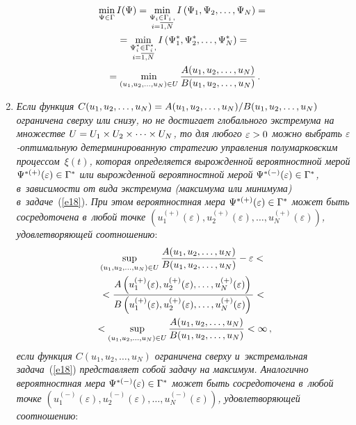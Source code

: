 \begin{multicols}{2}
\begin{enumerate}[1.]
\noindent
\begin{multline*}
\min\limits_{\Psi \in \Gamma} I(\Psi)=
\min\limits_{\substack{{\Psi_i \in \Gamma_i\,,}\\ 
{i=\overline{1,N}}}} I\left(\Psi_1,\Psi_2,\ldots,\Psi_N\right)={}\\
{}=
\min\limits_{\substack{{\Psi_i^* \in \Gamma_i^*,}\\ 
{i=\overline{1,N}}}}
I\left(\Psi_1^*,\Psi_2^*,\ldots,\Psi_N^*\right)={}\\
{}=\min\limits_{(u_1,u_2,\ldots,u_N)\in U}\fr{A(u_1,u_2,\ldots,u_N)}
{B(u_1,u_2,\ldots,u_N)}\,. %
\end{multline*}
\item \textit{Если функция $C(u_1,u_2,\ldots,u_N)\hm=
{A(u_1,u_2,\ldots,u_N)}/{B(u_1,u_2,\ldots,u_N)}$ ограничена сверху или снизу, 
но не достигает глобального экстремума на множестве $U\hm=U_1\times U_2\times\cdots
\times U_N$,
то для любого $\varepsilon\hm > 0$ можно выбрать $\varepsilon$-оп\-ти\-маль\-ную 
детерминированную стратегию управления полумарковским процессом~$\xi(t)$, 
которая определяется вырожденной
вероятностной мерой $\Psi^{*(+)}(\varepsilon)\hm\in \Gamma^*$ или вырожденной
вероятностной мерой $\Psi^{*(-)}(\varepsilon)\hm\in \Gamma^*$, в~зависимости от 
вида экстремума (максимума или минимума) в~задаче}~(\ref{e18}). 
\textit{При этом вероятностная мера $\Psi^{*(+)}(\varepsilon)\hm\in \Gamma^*$ может быть 
сосредоточена в~любой точке $\left(u_1^{(+)}(\varepsilon),u_2^{(+)}(\varepsilon),\ldots,
u_N^{(+)}(\varepsilon)\right)$, удовлетворяющей соотношению}:
\begin{multline}
\sup\limits_{(u_1,u_2,\ldots,u_N) \in U}
\displaystyle\frac{\displaystyle A(u_1,u_2,\ldots,u_N)\mathstrut}{\displaystyle B(u_1,u_2,\ldots,u_N)\mathstrut}-\varepsilon <{}\\
{}<
\displaystyle\frac{\displaystyle A\left(u_1^{(+)}(\varepsilon),u_2^{(+)}(\varepsilon),\ldots,u_N^{(+)}
(\varepsilon)\right)\mathstrut}{\displaystyle B\left(u_1^{(+)}(\varepsilon),u_2^{(+)}(\varepsilon),\ldots,u_N^{(+)}
(\varepsilon)\right)\mathstrut}<{}\\
{}<\sup\limits_{(u_1,u_2,\ldots,u_N) \in U}
\displaystyle\frac{\displaystyle A(u_1,u_2,\ldots,u_N)\mathstrut}{\displaystyle B(u_1,u_2,\ldots,u_N)\mathstrut}<\infty\,, 
\label{e21}
\end{multline}
\textit{если функция $C(u_1,u_2,\ldots,u_N)$ ограничена сверху 
и~экстремальная задача}~(\ref{e18}) 
\textit{представляет собой задачу на максимум. Аналогично вероятностная мера 
$\Psi^{*(-)}(\varepsilon)\hm\in \Gamma^*$ может быть сосредоточена в~любой точке 
$\left(u_1^{(-)}(\varepsilon),u_2^{(-)}(\varepsilon),\ldots,u_N^{(-)}(\varepsilon)
\right)$, удовлетворяющей соотношению}:


\end{enumerate}
\end{multicols}
